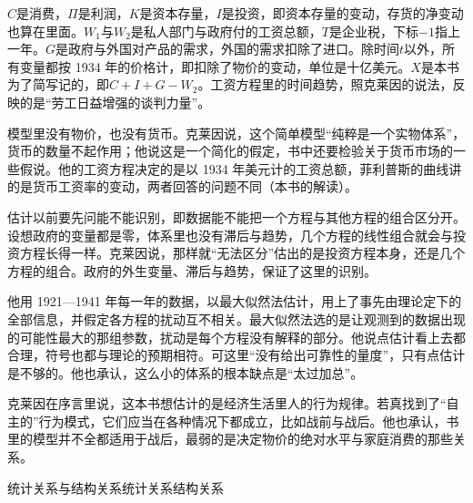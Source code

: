 $C$是消费，$\Pi$是利润，$K$是资本存量，$I$是投资，即资本存量的变动，存货的净变动也算在里面\cite{klein1950}。$W_1$与$W_2$是私人部门与政府付的工资总额，$T$是企业税，下标$-1$指上一年\cite{klein1950}。$G$是政府与外国对产品的需求，外国的需求扣除了进口\cite{klein1950}。除时间$t$以外，所有变量都按 1934 年的价格计，即扣除了物价的变动，单位是十亿美元\cite{klein1950}。$X$是本书为了简写记的，即$C+I+G-W_2$。工资方程里的时间趋势，照克莱因的说法，反映的是“劳工日益增强的谈判力量”\cite{klein1950}。

模型里没有物价，也没有货币。克莱因说，这个简单模型“纯粹是一个实物体系”，货币的数量不起作用；他说这是一个简化的假定，书中还要检验关于货币市场的一些假说\cite{klein1950}。他的工资方程决定的是以 1934 年美元计的工资总额，菲利普斯的曲线讲的是货币工资率的变动，两者回答的问题不同（本书的解读）。

估计以前要先问能不能识别，即数据能不能把一个方程与其他方程的组合区分开\cite{klein1950}。设想政府的变量都是零，体系里也没有滞后与趋势，几个方程的线性组合就会与投资方程长得一样\cite{klein1950}。克莱因说，那样就“无法区分”估出的是投资方程本身，还是几个方程的组合\cite{klein1950}。政府的外生变量、滞后与趋势，保证了这里的识别\cite{klein1950}。

他用 1921—1941 年每一年的数据，以最大似然法估计，用上了事先由理论定下的全部信息，并假定各方程的扰动互不相关\cite{klein1950}。最大似然法选的是让观测到的数据出现的可能性最大的那组参数，扰动是每个方程没有解释的部分。他说点估计看上去都合理，符号也都与理论的预期相符\cite{klein1950}。可这里“没有给出可靠性的量度”，只有点估计是不够的\cite{klein1950}。他也承认，这么小的体系的根本缺点是“太过加总”\cite{klein1950}。

克莱因在序言里说，这本书想估计的是经济生活里人的行为规律。若真找到了“自主的”行为模式，它们应当在各种情况下都成立，比如战前与战后\cite{klein1950}。他也承认，书里的模型并不全都适用于战后，最弱的是决定物价的绝对水平与家庭消费的那些关系\cite{klein1950}。

\begin{compare}{统计关系与结构关系}{统计关系}{结构关系}
\end{compare}


